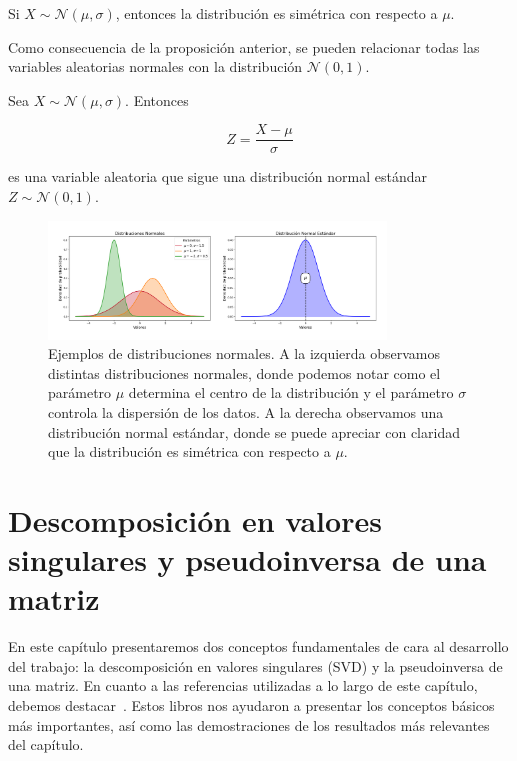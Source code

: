 \begin{proposicion}
    Si $X \sim \mathcal{N}(\mu,\sigma)$, entonces la distribución es simétrica con respecto a $\mu$.\newline
\end{proposicion}

Como consecuencia de la proposición anterior, se pueden relacionar todas las variables aleatorias normales con la distribución $\mathcal{N}(0,1)$.\newline

\begin{proposicion}
    Sea $X \sim \mathcal{N}(\mu,\sigma)$. Entonces
    
    \[ Z = \frac{X-\mu}{\sigma} \]

    es una variable aleatoria que sigue una distribución normal estándar $Z \sim\mathcal{N}(0,1)$.\newline
\end{proposicion}

\begin{figure}[h]
    \centering
    \includegraphics[width=0.8\textwidth]{img/distribuciones-normales.png}
    \caption[Ejemplos de distribuciones normales.] {Ejemplos de distribuciones normales. A la izquierda observamos distintas distribuciones normales, donde podemos notar como el parámetro $\mu$ determina el centro de la distribución y el parámetro $\sigma$ controla la dispersión de los datos. A la derecha observamos una distribución normal estándar, donde se puede apreciar con claridad que la distribución es simétrica con respecto a $\mu$.}\label{fig:distribuciones-normales}
\end{figure}

\chapter{Descomposición en valores singulares y pseudoinversa de una matriz}\label{ch:descomposicion-valores-singulares-pseudoinversa}

En este capítulo presentaremos dos conceptos fundamentales de cara al desarrollo del trabajo: la descomposición en valores singulares (SVD) y la pseudoinversa de una matriz. En cuanto a las referencias utilizadas a lo largo de este capítulo, debemos destacar~\cite{Friedberg2014linear, Strang2023, Poole2011}. Estos libros nos ayudaron a presentar los conceptos básicos más importantes, así como las demostraciones de los resultados más relevantes del capítulo.

